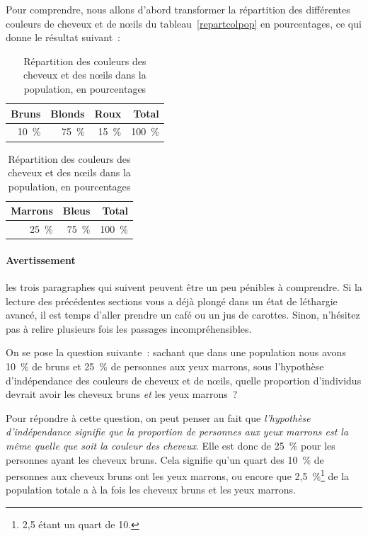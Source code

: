 \documentclass[a4paper,10pt,twoside,francais]{report}
\begin{document}
Pour comprendre, nous allons d'abord transformer la répartition
des différentes couleurs de cheveux et de n\oe{}ils du
tableau~\ref{repartcolpop} en pourcentages, ce qui donne le résultat
suivant~:

\begin{table}[H]
\begin{center}
  \hfill
  \begin{minipage}[c]{.40\linewidth}
    \begin{tabular}{rrrr}
      \toprule
      Bruns & Blonds & Roux & Total\\
      \midrule
      10~\% & 75~\% & 15~\% & 100~\%\\
      \bottomrule
    \end{tabular}
  \end{minipage} 
  \hfill
  \begin{minipage}[c]{.30\linewidth}
    \begin{tabular}{rrr}
      \toprule
      Marrons & Bleus & Total \\
      \midrule
      25~\% & 75~\% & 100~\% \\
      \bottomrule
    \end{tabular}
  \end{minipage}
  \hfill
  \caption{Répartition des couleurs des cheveux et des n\oe{}ils dans la
    population, en pourcentages}
  \label{repartcolpoppourc}
\end{center}
\end{table}

\paragraph{Avertissement} les trois paragraphes qui suivent peuvent
être un peu pénibles à comprendre. Si la lecture des précédentes
sections vous a déjà plongé dans un état de léthargie avancé, il est
temps d'aller prendre un café ou un jus de carottes. Sinon, n'hésitez
pas à relire plusieurs fois les passages incompréhensibles.

On se pose la question suivante~: sachant que dans une population nous
avons 10~\% de bruns et 25~\% de personnes aux yeux marrons, sous
l'hypothèse d'indépendance des couleurs de cheveux et de n\oe{}ils,
quelle proportion d'individus devrait avoir les cheveux bruns
\textit{et} les yeux marrons~?

Pour répondre à cette question, on peut penser au fait que
\textit{l'hypothèse d'indépendance signifie que la proportion de
  personnes aux yeux marrons est la même quelle que soit la couleur
  des cheveux}. Elle est donc de 25~\% pour les personnes ayant les
cheveux bruns. Cela signifie qu'un quart des 10~\% de personnes aux
cheveux bruns ont les yeux marrons, ou encore que 2,5~\%\footnote{2,5
  étant un quart de 10.}  de la population totale a à la fois les
cheveux bruns et les yeux marrons.
\end{document}
